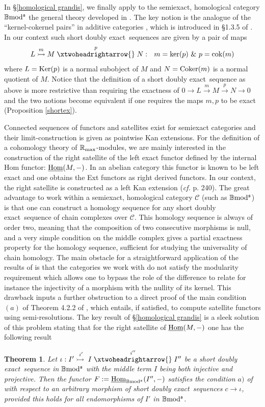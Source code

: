 \documentclass[12pt]{article}
\newtheorem{thm}{Theorem}[section]
\def\Homi{{\underline{\rm Hom}}}
\def\Ker{{\rm Ker}}
\def\sker{{\rm ker}}
\def\coker{{\rm Coker}}
\def\scoker{{\rm cok}}
\def\B{{\mathbb B}}
\def\R{{\mathbb R}}
\def\mC{{\mathscr C}}
\def\exxx{{doubly exact}~}
\newcommand{\cf}{{\it cf.}}
\def\rma{\R_{\rm max}}
\def\b2{{\rm \B mod^{\mathfrak s}}}
\begin{document}
In \S\ref{homological grandis}, we finally apply to the semiexact, homological category $\b2$ the general theory developed in \cite{gra1}. The key notion is the analogue of the ``kernel-cokernel pairs'' in additive categories \cite{Buhler}, which is introduced in \S1.3.5 of \cite{gra1}. In our context such short \exxx sequences are given by a pair of maps $$L\stackrel{m}{\rightarrowtail}M\stackrel{p}{\xtwoheadrightarrow{}}N:~~ m= \sker(p)\ \& \  p= \scoker(m)$$ 
  where  
  $L=\Ker(p)$ is a normal subobject of $M$ and $N=\coker(m)$ is a normal quotient of $M$. Notice that the definition of a short \exxx sequence  as above is more restrictive than requiring the exactness of  $0\to L\stackrel{m}{\to}M\stackrel{p}{\to}N\to 0$ and the two notions become equivalent if one requires the maps $m,p$ to be exact (Proposition \ref{shortex}).  
  
  Connected sequences of functors and satellites exist for semiexact categories and their limit-construction is given as pointwise Kan extensions. For the definition of a cohomology theory of $\rma$-modules, we are mainly interested in the construction of the right satellite of the left exact functor defined by the internal Hom functor: $\Homi(M,-)$.  In an abelian category this functor is known to be left exact  and one obtains
the Ext functors as right derived functors. In our context, the right satellite is constructed as a left Kan extension (\cf  \cite{MacLane} p. 240). The great advantage to work within a semiexact, homological category $\mC$ (such as $\b2$) is that one can construct a homology sequence for any short \exxx sequence of chain complexes over $\mC$. This homology sequence is always of order two, meaning that the composition of two consecutive morphisms is null, and a very simple condition on the middle complex gives a partial exactness property for the homology sequence, sufficient for studying the universality of chain homology. The main obstacle for a straightforward application of the results of \cite{gra1} is that the categories we work with do not satisfy the modularity requirement which allows one  to bypass the role of the difference to relate for instance the injectivity of a morphism with the nullity of its kernel. This drawback inputs a further obstruction  to a direct proof of the main condition $(a)$ of  Theorem 4.2.2 of \cite{gra1}, which entails, if satisfied, to compute satellite functors using semi-resolutions. The key result of \S\ref{homological grandis}  is a sleek solution of this problem stating that for the right satellite of  $\Homi(M,-)$ one has the following result
   \begin{thm}\label{reduction toendo intro} Let $\iota:I'\stackrel{i'}{\rightarrowtail{}} I \stackrel{i''}{\xtwoheadrightarrow{}} I''$ be a short \exxx sequence in $\b2$ with the middle term $I$ being  both injective and projective. 
Then the functor $F:=\Homi_\b2(I'',-)$ satisfies the condition $a)$ of \cite{gra1} with respect to an arbitrary morphism of short \exxx sequences $c\to \iota$, provided this holds for all  endomorphisms of $I'$ in $\b2$.
 \end{thm}
\end{document}
